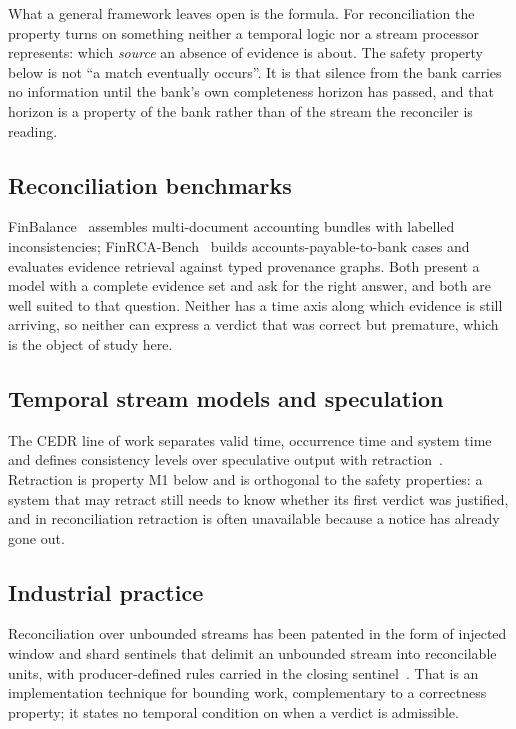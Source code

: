 \documentclass[10pt,conference]{IEEEtran}
\begin{document}
What a general framework leaves open is the formula. For reconciliation the property turns on something neither a temporal logic nor a stream
processor represents: which \emph{source} an absence of evidence is about. The safety
property below is not ``a match eventually occurs''. It is that silence from the
bank carries no information until the bank's own completeness horizon has
passed, and that horizon is a property of the bank rather than of the stream the
reconciler is reading.

\subsection{Reconciliation benchmarks}

FinBalance~\cite{finbalance} assembles multi-document accounting bundles with
labelled inconsistencies; FinRCA-Bench~\cite{finrca} builds
accounts-payable-to-bank cases and evaluates evidence retrieval against typed
provenance graphs. Both present a model with a complete evidence set and ask for
the right answer, and both are well suited to that question. Neither has a time
axis along which evidence is still arriving, so neither can express a verdict
that was correct but premature, which is the object of study here.

\subsection{Temporal stream models and speculation}

The CEDR line of work separates valid time, occurrence time and system time and
defines consistency levels over speculative output with
retraction~\cite{barga2007}. Retraction is property M1 below and is orthogonal
to the safety properties: a system that may retract still needs to know whether
its first verdict was justified, and in reconciliation retraction is often
unavailable because a notice has already gone out.

\subsection{Industrial practice}

Reconciliation over unbounded streams has been patented in the form of injected
window and shard sentinels that delimit an unbounded stream into reconcilable
units, with producer-defined rules carried in the closing
sentinel~\cite{patent2024}. That is an implementation technique for bounding
work, complementary to a correctness property; it states no temporal condition
on when a verdict is admissible.
\end{document}

